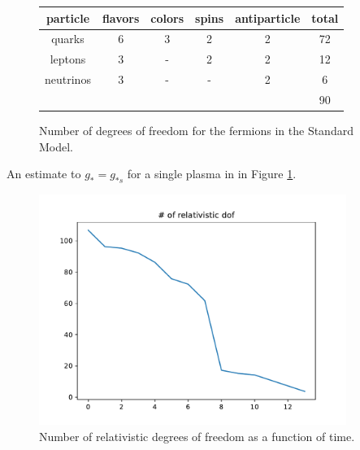 \documentclass[a4paper]{article}
\begin{document}
    \begin{figure}
    \centering
    \begin{tabular}{ c | c | c | c | c || c } 
        particle & flavors & colors & spins & antiparticle & total \\ 
        \hline
        quarks & 6 & 3 & 2 & 2  & 72 \\ 
        leptons & 3 & - & 2 & 2 & 12 \\ 
        neutrinos & 3 & - & - & 2 & 6 \\ 
        \hline
        \hline
        & & & & & 90 \\
    \end{tabular} 
    \caption{Number of degrees of freedom for the fermions in the Standard Model.}
    \end{figure}

    An estimate to $g_* = g_{*s}$ for a single plasma in in Figure \ref{dof}. 
    \begin{figure}[ht!]
        \centering
        \includegraphics[width=10cm]{dof.pdf}
        \caption{Number of relativistic degrees of freedom as a function of time.}
        \label{dof}
    \end{figure}


\nocite{taplecture} 
\nocite{kolbturner}  
\printbibliography

\immediate{}
\end{document}
